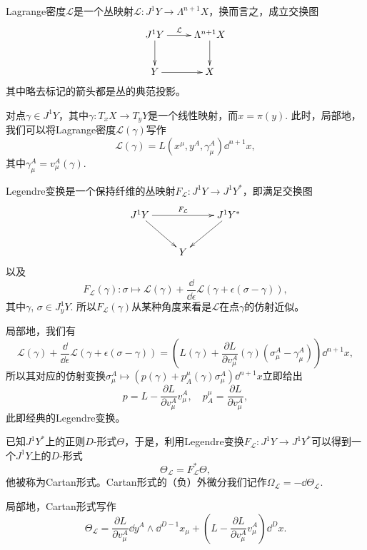 \begin{para}[Lagrange密度]
    Lagrange密度$\mathcal L$是一个丛映射$\mathcal L:J^1Y\to \Lambda^{n+1}X$，换而言之，成立交换图
    \[
        \xymatrix{
            J^1Y\ar[d]\ar[r]^-{\mathcal L}&\Lambda^{n+1}X\ar[d]\\
            Y\ar[r]&X
        }
    \]
    其中略去标记的箭头都是丛的典范投影。
\end{para}

对点$\gamma\in J^1Y$，其中$\gamma:T_xX\to T_yY$是一个线性映射，而$x=\pi(y)$. 此时，局部地，我们可以将Lagrange密度$\mathcal{L}(\gamma)$写作
\[
    \mathcal{L}(\gamma)=L\left(x^\mu,y^A,\gamma^A_\mu\right)\dd^{n+1}x,
\]
其中$\gamma^A_\mu=v^A_\mu(\gamma)$.

\begin{para}[Legendre变换]
    Legendre变换是一个保持纤维的丛映射$F_{\mathcal L}:J^1Y\to J^1Y^*$，即满足交换图
    \[
        \xymatrix{
        J^1Y\ar[dr]\ar[rr]^-{F_{\mathcal L}}&&J^1Y^*\ar[dl]\\
        &Y&
        }
    \]
    以及
    \[
        F_{\mathcal L}(\gamma):\sigma\mapsto\mathcal{L}(\gamma)+\frac{\dd}{\dd \epsilon}\mathcal L(\gamma+\epsilon(\sigma-\gamma)),
    \]
    其中$\gamma$, $\sigma\in J^1_yY$. 所以$F_{\mathcal L}(\gamma)$从某种角度来看是$\mathcal L$在点$\gamma$的仿射近似。
\end{para}

局部地，我们有
\[
    \mathcal{L}(\gamma)+\frac{\dd}{\dd \epsilon}\mathcal L(\gamma+\epsilon(\sigma-\gamma))=\left(L(\gamma)+\frac{\partial L}{\partial v^A_\mu}(\gamma)(\sigma^A_\mu-\gamma^A_\mu)\right)\dd^{n+1}x,
\]
所以其对应的仿射变换$\sigma^A_\mu\mapsto (p(\gamma)+p_A^\mu(\gamma) \sigma^A_\mu)\dd^{n+1}x$立即给出
\[
    p=L-\frac{\partial L}{\partial v^A_\mu}v^A_\mu,\quad p^\mu_A=\frac{\partial L}{\partial v^A_\mu},
\]
此即经典的Legendre变换。

\begin{para}[Cartan形式]
    已知$J^1Y^*$上的正则$D$-形式$\Theta$，于是，利用Legendre变换$F_{\mathcal L}:J^1Y\to J^1Y^*$可以得到一个$J^1Y$上的$D$-形式
    \[
        \Theta_{\mathcal L}=F_{\mathcal L}^*\Theta,
    \]
    他被称为Cartan形式。Cartan形式的（负）外微分我们记作$\Omega_{\mathcal L}=-\dd \Theta_{\mathcal L}$.
\end{para}

局部地，Cartan形式写作
\[
    \Theta_{\mathcal L}=\frac{\partial L}{\partial v^A_\mu}\dd y^A\wedge \dd^{D-1}x_\mu + \left(L-\frac{\partial L}{\partial v^A_\mu}v^A_\mu\right)\dd^{D} x.
\]


